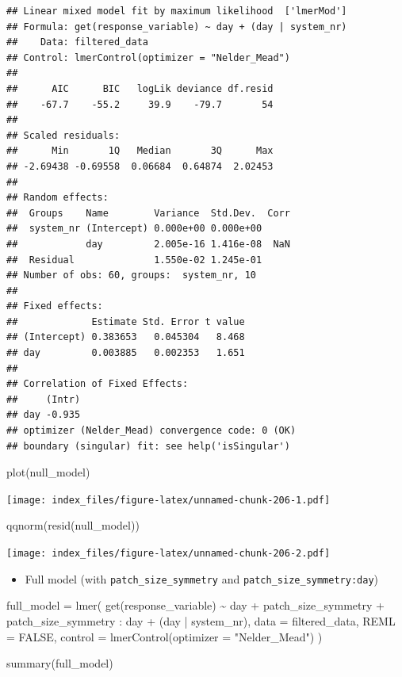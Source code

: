 \documentclass[
]{article}
\newenvironment{Shaded}{\begin{snugshade}}{\end{snugshade}}
\newcommand{\AttributeTok}[1]{\textcolor[rgb]{0.77,0.63,0.00}{#1}}
\newcommand{\ConstantTok}[1]{\textcolor[rgb]{0.00,0.00,0.00}{#1}}
\newcommand{\FunctionTok}[1]{\textcolor[rgb]{0.00,0.00,0.00}{#1}}
\newcommand{\NormalTok}[1]{#1}
\newcommand{\OtherTok}[1]{\textcolor[rgb]{0.56,0.35,0.01}{#1}}
\newcommand{\SpecialCharTok}[1]{\textcolor[rgb]{0.00,0.00,0.00}{#1}}
\newcommand{\StringTok}[1]{\textcolor[rgb]{0.31,0.60,0.02}{#1}}
\providecommand{\tightlist}{%
  \setlength{\itemsep}{0pt}\setlength{\parskip}{0pt}}
\begin{document}
\begin{verbatim}
## Linear mixed model fit by maximum likelihood  ['lmerMod']
## Formula: get(response_variable) ~ day + (day | system_nr)
##    Data: filtered_data
## Control: lmerControl(optimizer = "Nelder_Mead")
## 
##      AIC      BIC   logLik deviance df.resid 
##    -67.7    -55.2     39.9    -79.7       54 
## 
## Scaled residuals: 
##      Min       1Q   Median       3Q      Max 
## -2.69438 -0.69558  0.06684  0.64874  2.02453 
## 
## Random effects:
##  Groups    Name        Variance  Std.Dev.  Corr
##  system_nr (Intercept) 0.000e+00 0.000e+00     
##            day         2.005e-16 1.416e-08  NaN
##  Residual              1.550e-02 1.245e-01     
## Number of obs: 60, groups:  system_nr, 10
## 
## Fixed effects:
##             Estimate Std. Error t value
## (Intercept) 0.383653   0.045304   8.468
## day         0.003885   0.002353   1.651
## 
## Correlation of Fixed Effects:
##     (Intr)
## day -0.935
## optimizer (Nelder_Mead) convergence code: 0 (OK)
## boundary (singular) fit: see help('isSingular')
\end{verbatim}

\begin{Shaded}
\begin{Highlighting}[]
\FunctionTok{plot}\NormalTok{(null\_model)}
\end{Highlighting}
\end{Shaded}

\texttt{[image: index\_files/figure-latex/unnamed-chunk-206-1.pdf]}

\begin{Shaded}
\begin{Highlighting}[]
\FunctionTok{qqnorm}\NormalTok{(}\FunctionTok{resid}\NormalTok{(null\_model))}
\end{Highlighting}
\end{Shaded}

\texttt{[image: index\_files/figure-latex/unnamed-chunk-206-2.pdf]}

\begin{itemize}
\tightlist
\item
  Full model (with \texttt{patch\_size\_symmetry} and
  \texttt{patch\_size\_symmetry:day})
\end{itemize}

\begin{Shaded}
\begin{Highlighting}[]
\NormalTok{full\_model }\OtherTok{=} \FunctionTok{lmer}\NormalTok{(}
  \FunctionTok{get}\NormalTok{(response\_variable) }\SpecialCharTok{\textasciitilde{}}
\NormalTok{    day }\SpecialCharTok{+} 
\NormalTok{    patch\_size\_symmetry }\SpecialCharTok{+}
\NormalTok{    patch\_size\_symmetry }\SpecialCharTok{:}\NormalTok{ day }\SpecialCharTok{+} 
\NormalTok{    (day }\SpecialCharTok{|}\NormalTok{ system\_nr), }
  \AttributeTok{data =}\NormalTok{ filtered\_data,}
  \AttributeTok{REML =} \ConstantTok{FALSE}\NormalTok{,}
  \AttributeTok{control =} \FunctionTok{lmerControl}\NormalTok{(}\AttributeTok{optimizer =} \StringTok{"Nelder\_Mead"}\NormalTok{)}
\NormalTok{)}

\FunctionTok{summary}\NormalTok{(full\_model)}
\end{Highlighting}
\end{Shaded}
\end{document}
